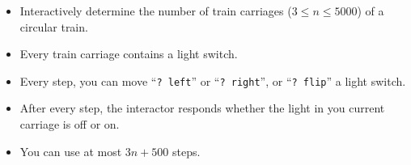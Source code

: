 \begin{frame}
    \frametitle{\problemtitle}

    \begin{columns}
        \begin{column}[T]{.65\textwidth}
            \begin{itemize}
                \item Interactively determine the number of train carriages ($3 \leq n \leq 5000$) of a circular train.
                \item Every train carriage contains a light switch.
                \item Every step, you can move ``\texttt{?~left}'' or ``\texttt{?~right}'', or ``\texttt{?~flip}'' a light switch.
                \item After every step, the interactor responds whether the light in you current carriage is off or on.
                \item You can use at most $3n + 500$ steps.
            \end{itemize}
        \end{column}

    \end{columns}
\end{frame}
